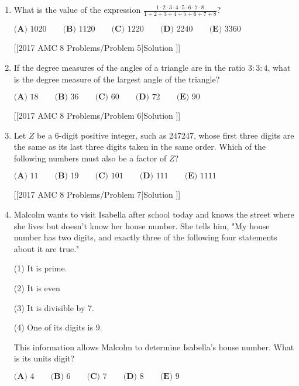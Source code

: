 \documentclass{article}
\begin{document}
\begin{enumerate}[label=\arabic*., itemsep=0.5em]
[[2017 AMC 8 Problems/Problem 4|Solution
]]\par \vspace{0.5em}\item What is the value of the expression \(\frac{1 \cdot 2 \cdot 3 \cdot 4 \cdot 5 \cdot 6 \cdot 7 \cdot 8}{1+2+3+4+5+6+7+8}\)?

\(\textbf{(A) }1020\qquad\textbf{(B) }1120\qquad\textbf{(C) }1220\qquad\textbf{(D) }2240\qquad\textbf{(E) }3360\)

[[2017 AMC 8 Problems/Problem 5|Solution
]]\par \vspace{0.5em}\item If the degree measures of the angles of a triangle are in the ratio \(3:3:4\), what is the degree measure of the largest angle of the triangle?

\(\textbf{(A) }18\qquad\textbf{(B) }36\qquad\textbf{(C) }60\qquad\textbf{(D) }72\qquad\textbf{(E) }90\)

[[2017 AMC 8 Problems/Problem 6|Solution
]]\par \vspace{0.5em}\item Let \(Z\) be a 6-digit positive integer, such as 247247, whose first three digits are the same as its last three digits taken in the same order. Which of the following numbers must also be a factor of \(Z\)?

\(\textbf{(A) }11\qquad\textbf{(B) }19\qquad\textbf{(C) }101\qquad\textbf{(D) }111\qquad\textbf{(E) }1111\)

[[2017 AMC 8 Problems/Problem 7|Solution
]]\par \vspace{0.5em}\item Malcolm wants to visit Isabella after school today and knows the street where she lives but doesn't know her house number. She tells him, "My house number has two digits, and exactly three of the following four statements about it are true."

(1) It is prime.

(2) It is even

(3) It is divisible by 7.

(4) One of its digits is 9.

This information allows Malcolm to determine Isabella's house number. What is its units digit?

\(\textbf{(A) }4\qquad\textbf{(B) }6\qquad\textbf{(C) }7\qquad\textbf{(D) }8\qquad\textbf{(E) }9\)


\end{enumerate}
\end{document}
